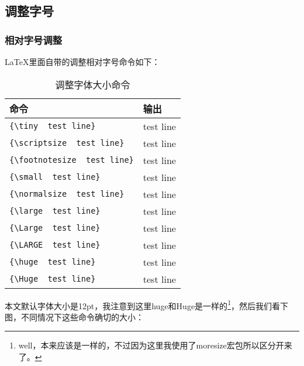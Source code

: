 \subsection{调整字号}

\subsubsection{相对字号调整}
\LaTeX 里面自带的调整相对字号命令如下：
\begin{table}[h]
\label{tab:调整字体大小命令}
\begin{tabular}{|l|l|}
\hline
命令 & 输出\\
\hline
\verb+{\tiny  test line}+ & {\tiny  test line}\\
\verb+{\scriptsize  test line}+ & {\scriptsize  test line}\\
\verb+{\footnotesize  test line}+ & {\footnotesize  test line}\\
\verb+{\small  test line}+ & {\small test line}\\
\verb+{\normalsize  test line}+ & {\normalsize  test line}\\
\verb+{\large  test line}+ & {\large  test line}\\
\verb+{\Large  test line}+ & {\Large  test line}\\
\verb+{\LARGE  test line}+ & {\LARGE  test line}\\
\verb+{\huge  test line}+ & {\huge  test line}\\
\verb+{\Huge  test line}+ & {\Huge  test line}\\
\hline
\end{tabular}
\caption{调整字体大小命令}
\end{table}

本文默认字体大小是12pt，我注意到这里huge和Huge是一样的\footnote{well，本来应该是一样的，不过因为这里我使用了moresize宏包所以区分开来了。}，然后我们看下图，不同情况下这些命令确切的大小：

